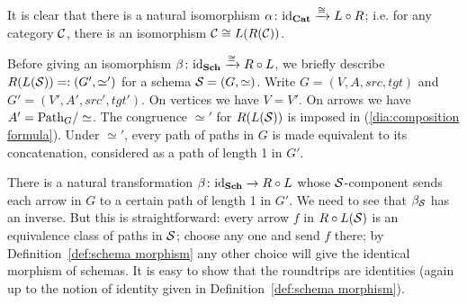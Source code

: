 \documentclass[CT4S-EN-RU]{subfiles}
\begin{document}
\begin{proofENG}
It is clear that there is a natural isomorphism $\alpha\colon\textnormal{id}_{\mathbf{Cat}}\xrightarrow{\cong} L\circ R$; i.e. for any category $\mathcal{C}$, there is an isomorphism $\mathcal{C}\cong L(R(\mathcal{C}))$. 

Before giving an isomorphism $\beta\colon\textnormal{id}_{\mathbf{Sch}}\xrightarrow{\cong}R\circ L$, we briefly describe $R(L(\mathcal{S}))=:(G',\simeq')$ for a schema $\mathcal{S}=(G,\simeq)$. Write $G=(V,A,src,tgt)$ and $G'=(V',A',src',tgt')$. On vertices we have $V=V'$. On arrows we have $A'=\textnormal{Path}_G/\simeq$. The congruence $\simeq'$ for $R(L(\mathcal{S}))$ is imposed in (\ref{dia:composition formula}). Under $\simeq'$, every path of paths in $G$ is made equivalent to its concatenation, considered as a path of length 1 in $G'$. 

There is a natural transformation $\beta\colon\textnormal{id}_{\mathbf{Sch}}\rightarrow R\circ L$ whose $\mathcal{S}$-component sends each arrow in $G$ to a certain path of length 1 in $G'$. We need to see that $\beta_\mathcal{S}$ has an inverse. But this is straightforward: every arrow $f$ in $R\circ L(\mathcal{S})$ is an  equivalence class of paths in $\mathcal{S}$; choose any one and send $f$ there; by Definition~\ref{def:schema morphism} any other choice will give the identical morphism of schemas. It is easy to show that the roundtrips are identities (again up to the notion of identity given in Definition~\ref{def:schema morphism}).
\end{proofENG}

\begin{proofRUS}
\end{proofRUS}
\end{document}
